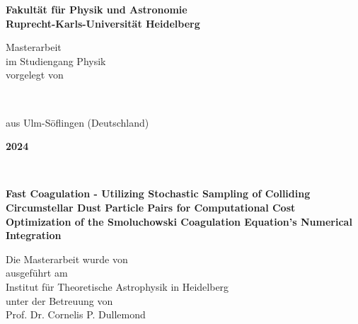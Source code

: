 \begin{titlepage}
    \begin{center}
        \begin{Large}
            \textbf{
              Fakultät für Physik und Astronomie \\
              Ruprecht-Karls-Universität Heidelberg
            }
        \end{Large}

        \vfill
        
        Masterarbeit \\
        im Studiengang Physik \\
        vorgelegt von \\
        \vspace{0.5cm}

        \begin{Large}
            \textbf{\theauthor} \\
        \end{Large}
        \vspace{0.5cm}

        aus Ulm-Söflingen (Deutschland) \\
        \vspace{0.5cm}

        \begin{Large}
            \textbf{2024}
        \end{Large}
    \end{center}
\end{titlepage}

\begin{titlepage}
    \ 
\end{titlepage}

\begin{titlepage}
    \begin{center}
        \begin{Large}
            \textbf{
                Fast Coagulation - Utilizing Stochastic Sampling of Colliding Circumstellar Dust 
                Particle Pairs for Computational Cost Optimization of the Smoluchowski Coagulation 
                Equation's Numerical Integration
            }
        \end{Large}
        
        \vfill
        
        Die Masterarbeit wurde von \theauthor \\
        ausgeführt am \\
        Institut für Theoretische Astrophysik in Heidelberg \\
        unter der Betreuung von \\
        Prof. Dr. Cornelis P. Dullemond
    \end{center}
\end{titlepage}

